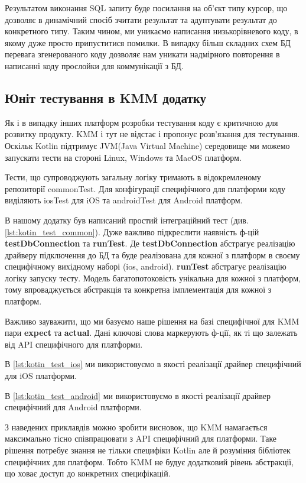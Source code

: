 Результатом виконання SQL запиту буде посилання на об'єкт типу курсор, що дозволяє в динамічний спосіб зчитати
результат та адуптувати результат до конкретного типу. Таким чином, ми уникаємо написання низькорівневого коду,
в якому дуже просто припуститися помилки. В випадку більш складних схем БД перевага згенерованого коду дозволяє
нам уникати надмірного повторення в написанні коду прослойки для коммунікації з БД.

\subsection{Юніт тестування в KMM додатку}
\label{subsec:kmm_unit_testing}

Як і в випадку інших платформ розробки тестування коду є критичною для розвитку продукту.
KMM і тут не відстає і пропонує розв'язання для тестування.
Оскільк Kotlin підтримує JVM(Java Virtual Machine) середовище ми можемо запускати тести на стороні Linux, Windows та MacOS платформ.

Тести, що супроводжують загальну логіку тримають в відокремленому репозиторії commonTest.
Для конфігурації специфічного для платформи коду виділяють iosTest для iOS та androidTest для Android платформ.

В нашому додатку був написаний простий інтеграційний тест (див. \ref{lst:kotin_test_common}).
Дуже важливо підкреслити наявність ф-цій \textbf{testDbConnection} та \textbf{runTest}.
Де \textbf{testDbConnection} абстрагує реалізацію драйверу підключення до БД та буде реалізована для кожної
з платформ в своєму специфічному вихідному наборі (ios, android).
\textbf{runTest} абстрагує реалізацію логіку запуску тесту.
Модель багатопотоковість унікальна для кожної з платформ, тому впроваджується абстракція та конкретна імплементація
для кожної з платформ.

Важливо зауважити, що ми базуємо наше рішення на базі специфічної для KMM пари \textbf{expect} та \textbf{actual}.
Дані ключові слова маркерують ф-ції, як ті що залежать від API специфічного для платформи.

В \ref{lst:kotin_test_ios} ми використовуємо в якості реалізації драйвер специфічний для iOS платформи.

В \ref{lst:kotin_test_android} ми використовуємо в якості реалізації драйвер специфічний для Android платформи.

З наведених приклавдів можно зробити висновок, що KMM намагається максимально тісно співпрацювати з API специфічний для платформи.
Таке рішення потребує знання не тільки специфіки Kotlin але й розуміння бібліотек специфічних для платформ.
Тобто KMM не будує додатковий рівень абстракції, що ховає доступ до конкретних специфікацій.
